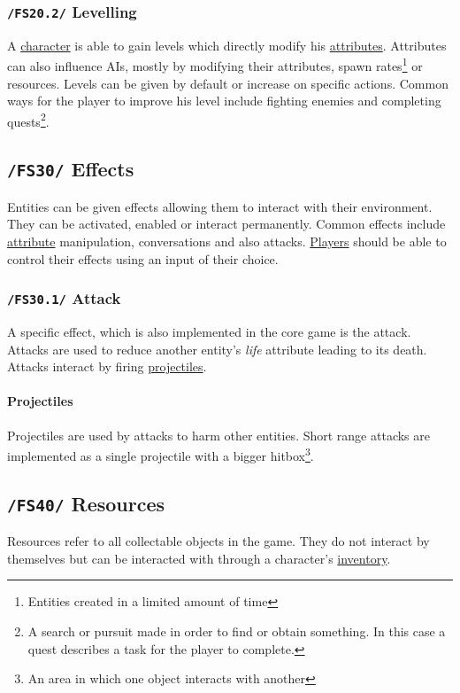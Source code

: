 \documentclass[11pt]{article}
\begin{document}
\subsubsection{\texttt{/FS20.2/} Levelling}\label{subsec:fs202levelling}
A \hyperref[subsec:fs20character]{character} is able to gain levels which directly modify his \hyperref[subsec:fs50attributes]{attributes}.
Attributes can also influence AIs, mostly by modifying their attributes, spawn rates\footnote{Entities created in a limited amount of time} or resources.
Levels can be given by default or increase on specific actions. Common ways for the player to improve his level include fighting enemies and completing quests\footnote{A search or pursuit made in order to find or obtain something. In this case a quest describes a task for the player to complete.}.
\subsection{\texttt{/FS30/} Effects}\label{subsec:fs30effects}
Entities can be given effects allowing them to interact with their environment.
They can be activated, enabled or interact permanently. Common effects include \hyperref[subsec:fs50attributes]{attribute} manipulation, conversations and also attacks.
\hyperref[subsec:fs60player]{Players} should be able to control their effects using an input of their choice.
\subsubsection{\texttt{/FS30.1/} Attack}
A specific effect, which is also implemented in the core game is the attack. Attacks are used to reduce another entity's \textit{life} attribute leading to its death.
Attacks interact by firing \hyperref[par:projectiles]{projectiles}.
\paragraph{Projectiles}\label{par:projectiles}
Projectiles are used by attacks to harm other entities. Short range attacks are implemented as a single projectile with a bigger hitbox\footnote{An area in which one object interacts with another}.
\subsection{\texttt{/FS40/} Resources}\label{subsec:fs40resources}
Resources refer to all collectable objects in the game. They do not interact by themselves but can be interacted with through a character's \hyperref[subsec:fs42inventory]{inventory}.
\end{document}
